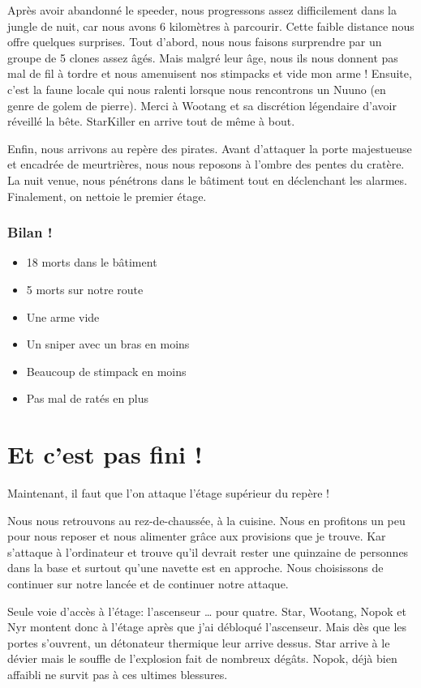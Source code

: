 \documentclass[a4paper,9pt,twoside,twocolumn,openany]{book}
\begin{document}
Après avoir abandonné le speeder, nous progressons assez difficilement dans la jungle de nuit, car nous avons 6 kilomètres à parcourir. Cette faible distance nous offre quelques surprises.
Tout d’abord, nous nous faisons surprendre par un groupe de 5 clones assez âgés. Mais malgré leur âge, nous ils nous donnent pas mal de fil à tordre et nous amenuisent nos stimpacks et vide mon arme ! Ensuite, c’est la faune locale qui nous ralenti lorsque nous rencontrons un Nuuno (en genre de golem de pierre). Merci à Wootang et sa discrétion légendaire d’avoir réveillé la bête. StarKiller en arrive tout de même à bout.

Enfin, nous arrivons au repère des pirates. Avant d’attaquer la porte majestueuse et encadrée de meurtrières, nous nous reposons à l’ombre des pentes du cratère. La nuit venue, nous pénétrons dans le bâtiment tout en déclenchant les alarmes. Finalement, on nettoie le premier étage.

\subsubsection{Bilan !}

\begin{itemize}
    \item 18 morts dans le bâtiment
    \item 5 morts sur notre route
    \item Une arme vide
    \item Un sniper avec un bras en moins
    \item Beaucoup de stimpack en moins
    \item Pas mal de ratés en plus
\end{itemize}

\section{Et c'est pas fini !}
\subtitle{10 décembre 2017}

Maintenant, il faut que l’on attaque l’étage supérieur du repère !

Nous nous retrouvons au rez-de-chaussée, à la cuisine. Nous en profitons un peu pour nous reposer et nous alimenter grâce aux provisions que je trouve. Kar s’attaque à l’ordinateur et trouve qu’il devrait rester une quinzaine de personnes dans la base et surtout qu’une navette est en approche. Nous choisissons de continuer sur notre lancée et de continuer notre attaque.

Seule voie d’accès à l’étage: l’ascenseur … pour quatre. Star, Wootang, Nopok et Nyr montent donc à l’étage après que j’ai débloqué l’ascenseur. Mais dès que les portes s’ouvrent, un détonateur thermique leur arrive dessus. Star arrive à le dévier mais le souffle de l’explosion fait de nombreux dégâts. Nopok, déjà bien affaibli ne survit pas à ces ultimes blessures.
\end{document}
